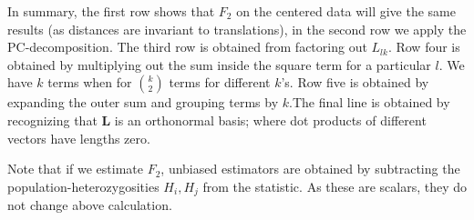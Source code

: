 \documentclass[10pt,a4paper]{article}
\newcommand{\ML}{\mathbf{L}} %
\begin{document}
In summary, the first row shows that $F_2$ on the centered data will give the same results (as distances are invariant to translations), in the second row we apply the PC-decomposition. The third row is obtained from factoring out $L_{lk}$. Row four is obtained by multiplying out the sum inside the square term for a particular $l$. We have $k$ terms when for $\binom{k}{2}$ terms for different $k$'s.  Row five is obtained by expanding the outer sum and grouping terms by $k$.The final line is obtained by recognizing that $\ML$ is an orthonormal basis; where dot products of different vectors have lengths zero.

Note that if we estimate $F_2$, unbiased estimators are obtained by subtracting the population-heterozygosities $H_i, H_j$ from the statistic. As these are scalars, they do not change above calculation.

\end{document}
